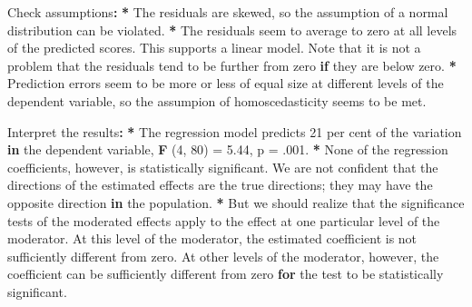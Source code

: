 \documentclass[a4paper]{book}
\newenvironment{Shaded}{\begin{snugshade}}{\end{snugshade}}
\newcommand{\KeywordTok}[1]{\textcolor[rgb]{0,0,0}{\textbf{#1}}}
\newcommand{\DecValTok}[1]{\textcolor[rgb]{0.00,0.00,0.00}{#1}}
\newcommand{\FloatTok}[1]{\textcolor[rgb]{0.00,0.00,0.00}{#1}}
\newcommand{\StringTok}[1]{\textcolor[rgb]{0.00,0.00,0.00}{#1}}
\newcommand{\ControlFlowTok}[1]{\textcolor[rgb]{0.00,0.00,0.00}{\textbf{#1}}}
\newcommand{\OperatorTok}[1]{\textcolor[rgb]{0.00,0.00,0.00}{\textbf{#1}}}
\newcommand{\ErrorTok}[1]{\textcolor[rgb]{0.00,0.00,0.00}{\textbf{#1}}}
\newcommand{\NormalTok}[1]{#1}
\theoremstyle{definition}
\theoremstyle{definition}
\theoremstyle{definition}
\theoremstyle{remark}
\begin{document}
\begin{Shaded}
\begin{Highlighting}[]
\NormalTok{Check assumptions}\OperatorTok{:}\StringTok{  }
\StringTok{  }
\ErrorTok{*}\StringTok{ }\NormalTok{The residuals are skewed, so the assumption of a normal distribution can be}
\NormalTok{violated.}
\OperatorTok{*}\StringTok{ }\NormalTok{The residuals seem to average to zero at all levels of the predicted}
\NormalTok{scores. This supports a linear model. Note that it is not a problem that the}
\NormalTok{residuals tend to be further from zero }\ControlFlowTok{if}\NormalTok{ they are below zero.}
\OperatorTok{*}\StringTok{ }\NormalTok{Prediction errors seem to be more or less of equal size at different levels}
\NormalTok{of the dependent variable, so the assumpion of homoscedasticity seems to be met.}
  
\NormalTok{Interpret the results}\OperatorTok{:}\StringTok{  }
\StringTok{  }
\ErrorTok{*}\StringTok{ }\NormalTok{The regression model predicts }\DecValTok{21}\NormalTok{ per cent of the variation }\ControlFlowTok{in}\NormalTok{ the dependent}
\NormalTok{variable, }\KeywordTok{F}\NormalTok{ (}\DecValTok{4}\NormalTok{, }\DecValTok{80}\NormalTok{) =}\StringTok{ }\FloatTok{5.44}\NormalTok{, p =}\StringTok{ }\NormalTok{.}\DecValTok{001}\NormalTok{.}
\OperatorTok{*}\StringTok{ }\NormalTok{None of the regression coefficients, however, is statistically significant.}
\NormalTok{We are not confident that the directions of the estimated effects are the true}
\NormalTok{directions; they may have the opposite direction }\ControlFlowTok{in}\NormalTok{ the population.}
\OperatorTok{*}\StringTok{ }\NormalTok{But we should realize that the significance tests of the moderated}
\NormalTok{effects apply to the effect at one particular level of the moderator. At this}
\NormalTok{level of the moderator, the estimated coefficient is not sufficiently}
\NormalTok{different from zero. At other levels of the moderator, however, the}
\NormalTok{coefficient can be sufficiently different from zero }\ControlFlowTok{for}\NormalTok{ the test to be}
\NormalTok{statistically significant.}
  

\end{Highlighting}
\end{Shaded}
\end{document}

